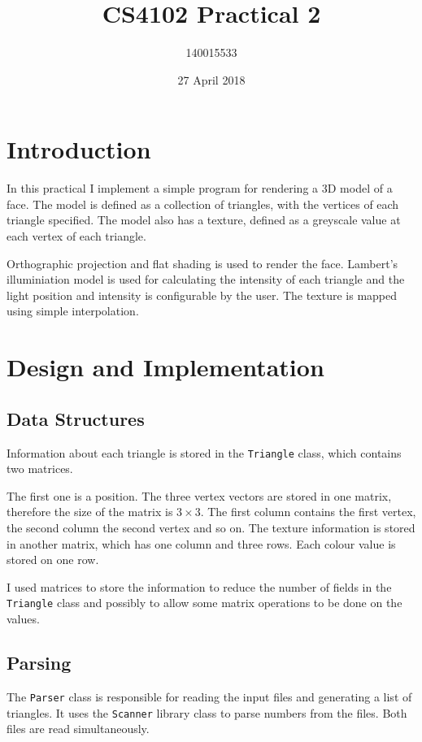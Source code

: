 \documentclass[]{article}
\title{CS4102 Practical 2}
\author{140015533}
\date{27 April 2018}
\begin{document}
\maketitle

\section{Introduction}

In this practical I implement a simple program for rendering a 3D model of a face. The model is defined as a collection of triangles, with the vertices of each triangle specified. The model also has a texture, defined as a greyscale value at each vertex of each triangle.

Orthographic projection and flat shading is used to render the face. Lambert's illuminiation model is used for calculating the intensity of each triangle and the light position and intensity is configurable by the user. The texture is mapped using simple interpolation.

\section{Design and Implementation}

\subsection{Data Structures}

Information about each triangle is stored in the \texttt{Triangle} class, which contains two matrices.

The first one is a position. The three vertex vectors are stored in one matrix, therefore the size of the matrix is $3 \times 3$. The first column contains the first vertex, the second column the second vertex and so on. The texture information is stored in another matrix, which has one column and three rows. Each colour value is stored on one row.

I used matrices to store the information to reduce the number of fields in the \texttt{Triangle} class and possibly to allow some matrix operations to be done on the values.

\subsection{Parsing}

The \texttt{Parser} class is responsible for reading the input files and generating a list of triangles. It uses the \texttt{Scanner} library class to parse numbers from the files. Both files are read simultaneously.
\end{document}
